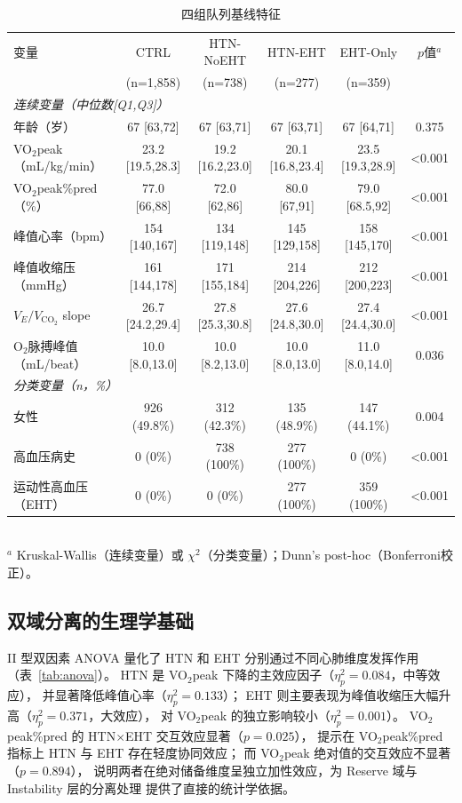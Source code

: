 \documentclass[12pt, a4paper]{ctexart}
\begin{document}
\begin{table}[htbp]
\centering
\small
\caption{四组队列基线特征}
\label{tab:table1}
\begin{tabular}{lccccc}
\toprule
变量 & CTRL & HTN-NoEHT & HTN-EHT & EHT-Only & $p$值$^a$ \\
 & (n=1,858) & (n=738) & (n=277) & (n=359) & \\
\midrule
\multicolumn{6}{l}{\textit{连续变量（中位数[Q1,Q3]）}} \\
年龄（岁）& 67 [63,72] & 67 [63,71] & 67 [63,71] & 67 [64,71] & 0.375 \\
VO$_2$peak（mL/kg/min）& 23.2 [19.5,28.3] & 19.2 [16.2,23.0] & 20.1 [16.8,23.4] & 23.5 [19.3,28.9] & <0.001 \\
VO$_2$peak\%pred（\%）& 77.0 [66,88] & 72.0 [62,86] & 80.0 [67,91] & 79.0 [68.5,92] & <0.001 \\
峰值心率（bpm）& 154 [140,167] & 134 [119,148] & 145 [129,158] & 158 [145,170] & <0.001 \\
峰值收缩压（mmHg）& 161 [144,178] & 171 [155,184] & 214 [204,226] & 212 [200,223] & <0.001 \\
$V_E/V_{\text{CO}_2}$ slope & 26.7 [24.2,29.4] & 27.8 [25.3,30.8] & 27.6 [24.8,30.0] & 27.4 [24.4,30.0] & <0.001 \\
O$_2$脉搏峰值（mL/beat）& 10.0 [8.0,13.0] & 10.0 [8.2,13.0] & 10.0 [8.0,13.0] & 11.0 [8.0,14.0] & 0.036 \\
\midrule
\multicolumn{6}{l}{\textit{分类变量（n，\%）}} \\
女性 & 926 (49.8\%) & 312 (42.3\%) & 135 (48.9\%) & 147 (44.1\%) & 0.004 \\
高血压病史 & 0 (0\%) & 738 (100\%) & 277 (100\%) & 0 (0\%) & <0.001 \\
运动性高血压（EHT）& 0 (0\%) & 0 (0\%) & 277 (100\%) & 359 (100\%) & <0.001 \\
\bottomrule
\end{tabular}
\\[1ex]
{\footnotesize $^a$ Kruskal-Wallis（连续变量）或 $\chi^2$（分类变量）；Dunn's post-hoc（Bonferroni校正）。}
\end{table}

\subsection{双域分离的生理学基础}

II 型双因素 ANOVA 量化了 HTN 和 EHT 分别通过不同心肺维度发挥作用
（表~\ref{tab:anova}）。
HTN 是 VO$_2$peak 下降的主效应因子（$\eta^2_p = 0.084$，中等效应），
并显著降低峰值心率（$\eta^2_p = 0.133$）；
EHT 则主要表现为峰值收缩压大幅升高（$\eta^2_p = 0.371$，大效应），
对 VO$_2$peak 的独立影响较小（$\eta^2_p = 0.001$）。
VO$_2$peak\%pred 的 HTN$\times$EHT 交互效应显著（$p = 0.025$），
提示在 VO$_2$peak\%pred 指标上 HTN 与 EHT 存在轻度协同效应；
而 VO$_2$peak 绝对值的交互效应不显著（$p = 0.894$），
说明两者在绝对储备维度呈独立加性效应，为 Reserve 域与 Instability 层的分离处理
提供了直接的统计学依据。
\end{document}
